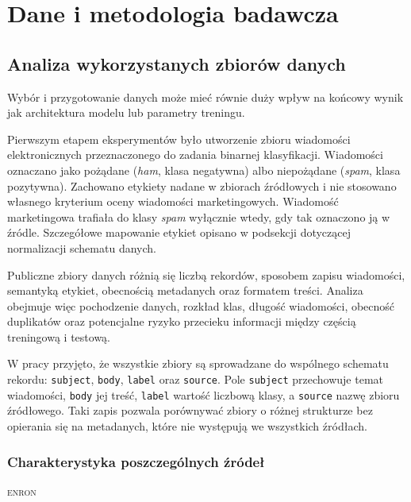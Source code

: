 \section{Dane i metodologia badawcza}

\subsection{Analiza wykorzystanych zbiorów danych}

Wybór i przygotowanie danych może mieć równie duży wpływ na końcowy wynik jak
architektura modelu lub parametry treningu.

Pierwszym etapem eksperymentów było utworzenie zbioru wiadomości elektronicznych
przeznaczonego do zadania binarnej klasyfikacji. Wiadomości oznaczano jako
pożądane (\emph{ham}, klasa negatywna) albo niepożądane (\emph{spam}, klasa
pozytywna). Zachowano etykiety nadane w zbiorach źródłowych i nie stosowano
własnego kryterium oceny wiadomości marketingowych. Wiadomość marketingowa
trafiała do klasy \emph{spam} wyłącznie wtedy, gdy tak oznaczono ją w źródle.
Szczegółowe mapowanie etykiet opisano w podsekcji dotyczącej normalizacji
schematu danych.

Publiczne zbiory danych różnią się liczbą rekordów, sposobem zapisu wiadomości,
semantyką etykiet, obecnością metadanych oraz formatem treści. Analiza obejmuje
więc pochodzenie danych, rozkład klas, długość wiadomości, obecność duplikatów oraz
potencjalne ryzyko przecieku informacji między częścią treningową i testową.

W pracy przyjęto, że wszystkie zbiory są sprowadzane do wspólnego schematu
rekordu: \texttt{subject}, \texttt{body}, \texttt{label} oraz \texttt{source}.
Pole \texttt{subject} przechowuje temat wiadomości, \texttt{body} jej treść,
\texttt{label} wartość liczbową klasy, a \texttt{source} nazwę zbioru
źródłowego. Taki zapis pozwala porównywać zbiory o różnej strukturze bez
opierania się na metadanych, które nie występują we wszystkich źródłach.

\subsubsection{Charakterystyka poszczególnych źródeł}

\textsc{enron}

